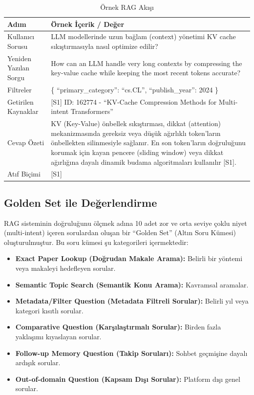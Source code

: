 \begin{table}[H]
\centering
\caption{Örnek RAG Akışı}
\label{tab:rag_akisi}
\begin{tabular}{lp{10cm}}
\hline
Adım & Örnek İçerik / Değer \\
\hline
Kullanıcı Sorusu & LLM modellerinde uzun bağlam (context) yönetimi KV cache sıkıştırmasıyla nasıl optimize edilir? \\
Yeniden Yazılan Sorgu & How can an LLM handle very long contexts by compressing the key-value cache while keeping the most recent tokens accurate? \\
Filtreler & \{ ``primary\_category'': ``cs.CL'', ``publish\_year'': 2024 \} \\
Getirilen Kaynaklar & [S1] ID: 162774 - ``KV-Cache Compression Methods for Multi-intent Transformers'' \\
Cevap Özeti & KV (Key-Value) önbellek sıkıştırması, dikkat (attention) mekanizmasında gereksiz veya düşük ağırlıklı token'ların önbellekten silinmesiyle sağlanır. En son token'ların doğruluğunu korumak için kayan pencere (sliding window) veya dikkat ağırlığına dayalı dinamik budama algoritmaları kullanılır [S1]. \\
Atıf Biçimi & [S1] \\
\hline
\end{tabular}
\end{table}

\subsection{Golden Set ile Değerlendirme}
RAG sisteminin doğruluğunu ölçmek adına 10 adet zor ve orta seviye çoklu niyet (multi-intent) içeren sorulardan oluşan bir ``Golden Set'' (Altın Soru Kümesi) oluşturulmuştur. Bu soru kümesi şu kategorileri içermektedir:
\begin{itemize}
    \item \textbf{Exact Paper Lookup (Doğrudan Makale Arama):} Belirli bir yöntemi veya makaleyi hedefleyen sorular.
    \item \textbf{Semantic Topic Search (Semantik Konu Arama):} Kavramsal aramalar.
    \item \textbf{Metadata/Filter Question (Metadata Filtreli Sorular):} Belirli yıl veya kategori kısıtlı sorular.
    \item \textbf{Comparative Question (Karşılaştırmalı Sorular):} Birden fazla yaklaşımı kıyaslayan sorular.
    \item \textbf{Follow-up Memory Question (Takip Soruları):} Sohbet geçmişine dayalı ardışık sorular.
    \item \textbf{Out-of-domain Question (Kapsam Dışı Sorular):} Platform dışı genel sorular.
\end{itemize}

